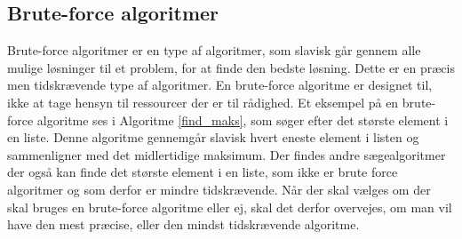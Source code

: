 \subsection{Brute-force algoritmer}
Brute-force algoritmer er en type af algoritmer, som slavisk går gennem alle mulige løsninger til et problem, for at finde den bedste løsning.
Dette er en præcis men tidskrævende type af algoritmer. 
En brute-force algoritme er designet til, ikke at tage hensyn til ressourcer der er til rådighed.
Et eksempel på en brute-force algoritme ses i Algoritme \ref{find_maks}, som søger efter det største element i en liste. 
Denne algoritme gennemgår slavisk hvert eneste element i listen og sammenligner med det midlertidige maksimum.
Der findes andre sægealgoritmer der også kan finde det største element i en liste, som ikke er brute force algoritmer og som derfor er mindre tidskrævende. 
Når der skal vælges om der skal bruges en brute-force algoritme eller ej, skal det derfor overvejes, om man vil have den mest præcise, eller den mindst tidskrævende algoritme. 
